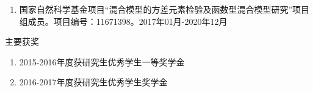 \begin{enumerate}
\tightlist
\item 国家自然科学基金项目“混合模型的方差元素检验及函数型混合模型研究”项目组成员。项目编号：11671398。2017年01月-2020年12月
\end{enumerate}

\begin{center}
{\kaishu {} 主要获奖}
\end{center}

\begin{enumerate}
\tightlist
\item 2015-2016年度获研究生优秀学生一等奖学金
\item 2016-2017年度获研究生优秀学生奖学金
\end{enumerate}


% 
% 




\backmatter

